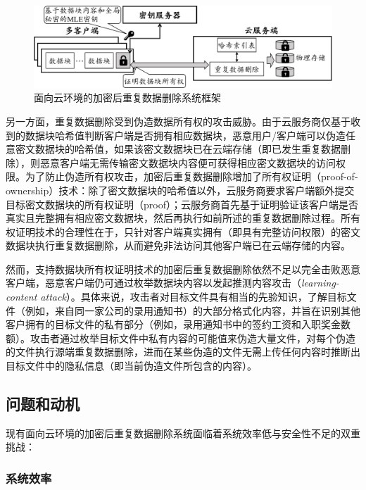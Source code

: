 \begin{figure}[!htb]
    \small
    \centering
    \includegraphics[width=\textwidth]{pic/Cloud-encrypted-deduplication-logic.pdf}
    \caption{面向云环境的加密后重复数据删除系统框架}
    \label{fig:Cloud-based-encrypted-deduplication-storage-logic}
\end{figure}

另一方面，重复数据删除受到伪造数据所有权的攻击威胁\cite{harnik10,mulazzani11}。由于云服务商仅基于收到的数据块哈希值判断客户端是否拥有相应数据块，恶意用户/客户端可以伪造任意密文数据块的哈希值，如果该密文数据块已在云端存储（即已发生重复数据删除），则恶意客户端无需传输密文数据块内容便可获得相应密文数据块的访问权限。为了防止伪造所有权攻击，加密后重复数据删除增加了所有权证明（proof-of-ownership）技术\cite{halevi11}：除了密文数据块的哈希值以外，云服务商要求客户端额外提交目标密文数据块的所有权证明（proof）；云服务商首先基于证明验证该客户端是否真实且完整拥有相应密文数据块，然后再执行如前所述的重复数据删除过程。所有权证明技术的合理性在于，只针对客户端真实拥有（即具有完整访问权限）的密文数据块执行重复数据删除，从而避免非法访问其他客户端已在云端存储的内容。

然而，支持数据块所有权证明技术的加密后重复数据删除依然不足以完全击败恶意客户端，恶意客户端仍可通过枚举数据块内容以发起推测内容攻击（{\em learning-content attack}）\cite{harnik10, zuo2018mitigating}。具体来说，攻击者对目标文件具有相当的先验知识，了解目标文件（例如，来自同一家公司的录用通知书）的大部分格式化内容，并旨在识别其他客户拥有的目标文件的私有部分（例如，录用通知书中的签约工资和入职奖金数额）。攻击者通过枚举目标文件中私有内容的可能值来伪造大量文件，对每个伪造的文件执行源端重复数据删除，进而在某些伪造的文件无需上传任何内容时推断出目标文件中的隐私信息（即当前伪造文件所包含的内容）。

\subsection{问题和动机}
\label{subsec:intro-problem}

现有面向云环境的加密后重复数据删除系统面临着系统效率低与安全性不足的双重挑战：

\subsubsection{系统效率} 
\label{subsec:intro-problem-performance}

